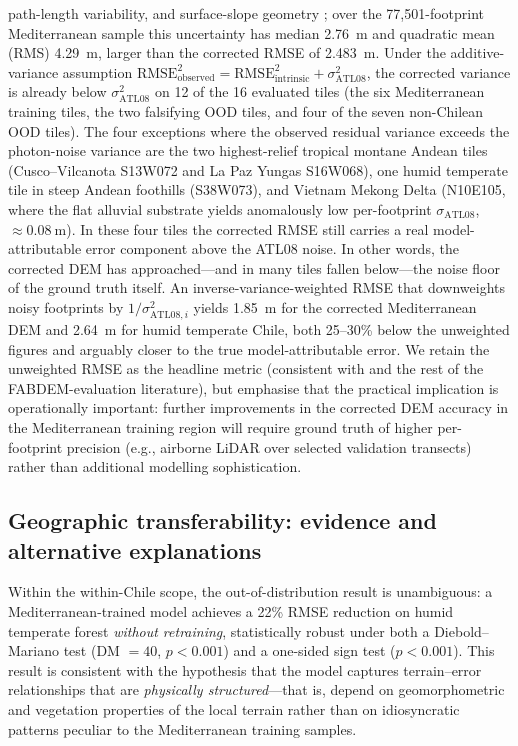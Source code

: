 \documentclass[preprint,authoryear,number]{elsarticle}
\begin{document}
path-length variability, and surface-slope geometry \citep{Neuenschwander2019ATL08,Brunt2021ICESat2Accuracy,Magruder2021ICESat2Performance}; over the 77{,}501-footprint Mediterranean sample this uncertainty has median \SI{2.76}{\meter} and quadratic mean (RMS) \SI{4.29}{\meter}, larger than the corrected RMSE of \SI{2.483}{\meter}. Under the additive-variance assumption $\text{RMSE}_{\text{observed}}^{2} = \text{RMSE}_{\text{intrinsic}}^{2} + \sigma_{\text{ATL08}}^{2}$, the corrected variance is already below $\sigma_{\text{ATL08}}^{2}$ on 12 of the 16 evaluated tiles (the six Mediterranean training tiles, the two falsifying OOD tiles, and four of the seven non-Chilean OOD tiles). The four exceptions where the observed residual variance exceeds the photon-noise variance are the two highest-relief tropical montane Andean tiles (Cusco--Vilcanota S13W072 and La Paz Yungas S16W068), one humid temperate tile in steep Andean foothills (S38W073), and Vietnam Mekong Delta (N10E105, where the flat alluvial substrate yields anomalously low per-footprint $\sigma_{\text{ATL08}}$, $\approx \SI{0.08}{\meter}$). In these four tiles the corrected RMSE still carries a real model-attributable error component above the ATL08 noise. In other words, the corrected DEM has approached---and in many tiles fallen below---the noise floor of the ground truth itself. An inverse-variance-weighted RMSE that downweights noisy footprints by $1/\sigma_{\text{ATL08},i}^{2}$ yields \SI{1.85}{\meter} for the corrected Mediterranean DEM and \SI{2.64}{\meter} for humid temperate Chile, both 25--30\% below the unweighted figures and arguably closer to the true model-attributable error. We retain the unweighted RMSE as the headline metric (consistent with \citealt{Hawker2022FABDEM} and the rest of the FABDEM-evaluation literature), but emphasise that the practical implication is operationally important: further improvements in the corrected DEM accuracy in the Mediterranean training region will require ground truth of higher per-footprint precision (e.g., airborne LiDAR over selected validation transects) rather than additional modelling sophistication.

\subsection{Geographic transferability: evidence and alternative explanations}
\label{sec:transferability}

Within the within-Chile scope, the out-of-distribution result is unambiguous: a Mediterranean-trained model achieves a 22\% RMSE reduction on humid temperate forest \emph{without retraining}, statistically robust under both a Diebold--Mariano test (DM $= 40$, $p < 0.001$) and a one-sided sign test ($p < 0.001$). This result is consistent with the hypothesis that the model captures terrain--error relationships that are \emph{physically structured}---that is, depend on geomorphometric and vegetation properties of the local terrain rather than on idiosyncratic patterns peculiar to the Mediterranean training samples.
\end{document}
